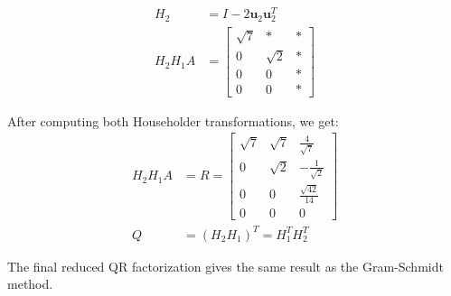 \begin{enumerate}
\begin{align*}
              H_2                & = I - 2\mathbf{u}_2\mathbf{u}_2^T                                                                                                                                               \\
              H_2 H_1 A          & = \begin{bmatrix}
                                         \sqrt{7} & *        & * \\
                                         0        & \sqrt{2} & * \\
                                         0        & 0        & * \\
                                         0        & 0        & *
                                     \end{bmatrix}
          \end{align*}
\end{enumerate}
After computing both Householder transformations, we get:
\begin{align*}
    H_2 H_1 A & = R = \begin{bmatrix}
                          \sqrt{7} & \sqrt{7} & \frac{4}{\sqrt{7}}   \\
                          0        & \sqrt{2} & -\frac{1}{\sqrt{2}}  \\
                          0        & 0        & \frac{\sqrt{42}}{14} \\
                          0        & 0        & 0
                      \end{bmatrix} \\
    Q         & = (H_2 H_1)^T = H_1^T H_2^T
\end{align*}

The final reduced QR factorization gives the same result as the Gram-Schmidt method.

